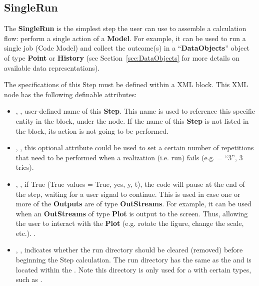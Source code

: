 \subsection{SingleRun}
\label{subsec:stepSingleRun}
The \textbf{SingleRun} is the simplest step the user can use to assemble a
calculation flow: perform a single action of a \textbf{Model}.
%
For example, it can be used to run a single job (Code Model) and collect the
outcome(s) in a ``\textbf{DataObjects}'' object of type \textbf{Point} or
\textbf{History} (see Section~\ref{sec:DataObjects} for more details on available data
representations).

The specifications of this Step must be defined within a  XML
block.
%
This XML node has the following definable attributes:
\vspace{-5mm}
\begin{itemize}
\itemsep0em
\item {}, , user-defined name of
  this \textbf{Step}. \nb This name is used to reference this specific entity
  in the  block, under the  node. If the name
  of this \textbf{Step} is not listed in the   block, its action is not
  going to be performed.
\item {}, , this optional
  attribute could be used to set a certain number of repetitions that need to be performed
  when a realization (i.e. run) fails (e.g.  = ``3'', 3 tries).
\item {}, , if True
  (True values = True, yes, y, t), the code will pause at the end of
  the step, waiting for a user signal to continue. This is used in case one or
  more of the \textbf{Outputs} are of type \textbf{OutStreams}.
  For example, it can be used when an \textbf{OutStreams} of type
  \textbf{Plot} is output to the screen. Thus, allowing the user to interact with
  the \textbf{Plot} (e.g. rotate the figure, change the scale, etc.).
  .
\item {}, , indicates whether the run
  directory should be cleared (removed) before beginning
  the Step calculation. The run directory has the same  as the  and is
  located within the . Note this directory is only used for a 
  with certain  types, such as .
\end{itemize}

